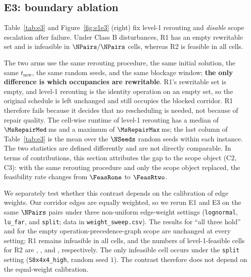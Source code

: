 \subsection{E3: boundary ablation}
\label{sec:e3}

Table~\ref{tab:e3} and Figure~\ref{fig:e1e3} (right) fix level-1 rerouting and \emph{disable} scope escalation after failure.
Under Class B disturbances, R1 has an empty rewritable set and is infeasible in \(\NPairs/\NPairs\) cells, whereas R2 is feasible in all cells.

The two arms use the same rerouting procedure, the same initial solution, the same \(t_{\mathrm{now}}\), the same random seeds, and the same blockage window;
\textbf{the only difference is which occupancies are rewritable}. R1's rewritable set is empty, and level-1 rerouting is the identity operation on an empty set,
so the original schedule is left unchanged and still occupies the blocked corridor. R1 therefore fails because it decides that no rescheduling is needed, not because of repair quality.
The cell-wise runtime of level-1 rerouting has a median of \(\MsRepairMed\)\,ms and a maximum of \(\MsRepairMax\)\,ms; the last column of Table~\ref{tab:e3}
is the mean over the \(\NSeeds\) random seeds within each instance. The two statistics are defined differently and are not directly comparable.
In terms of contributions, this section attributes the gap to the scope object (C2, C3): with the same rerouting procedure and only the scope object replaced, the feasibility rate changes from
\(\FeasRone\) to \(\FeasRtwo\).

We separately test whether this contrast depends on the calibration of edge weights. Our corridor edges are equally weighted, so we rerun E1 and E3 on the same \(\NPairs\) pairs
under three non-uniform edge-weight settings
(\texttt{lognormal}, \texttt{lu\_far}, and \texttt{split}; data in \texttt{weight\_sweep.csv}). The results for ``all three hold'' and for the empty operation-precedence-graph scope are unchanged at every setting;
R1 remains infeasible in all cells, and the numbers of level-1-feasible cells for R2 are \WeightLogRtwo, \WeightLuRtwo, and \WeightSplitRtwo, respectively.
The only infeasible cell occurs under the \texttt{split} setting (\texttt{S8x4x4\_high}, random seed \(1\)).
The contrast therefore does not depend on the equal-weight calibration.

